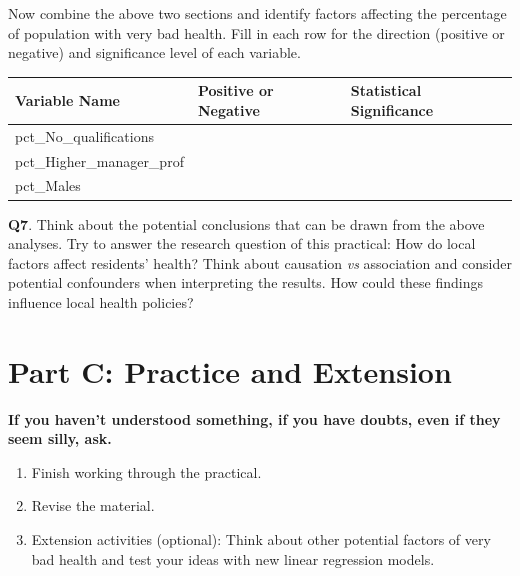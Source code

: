 \documentclass[
  letterpaper,
  DIV=11,
  numbers=noendperiod]{scrreprt}
\providecommand{\tightlist}{%
  \setlength{\itemsep}{0pt}\setlength{\parskip}{0pt}}\usepackage{longtable,booktabs,array}
\begin{document}
Now combine the above two sections and identify factors affecting the
percentage of population with very bad health. Fill in each row for the
direction (positive or negative) and significance level of each
variable.

\begin{longtable}[]{@{}
  >{\raggedright\arraybackslash}p{}
  >{\raggedright\arraybackslash}p{}
  >{\raggedright\arraybackslash}p{}@{}}
\toprule\noalign{}
\begin{minipage}[b]{\linewidth}\raggedright
Variable Name
\end{minipage} & \begin{minipage}[b]{\linewidth}\raggedright
Positive or Negative
\end{minipage} & \begin{minipage}[b]{\linewidth}\raggedright
Statistical Significance
\end{minipage} \\
\midrule\noalign{}
\endhead
\bottomrule\noalign{}
\endlastfoot
pct\_No\_qualifications & & \\
pct\_Higher\_manager\_prof & & \\
pct\_Males & & \\
\end{longtable}

\textbf{Q7}. Think about the potential conclusions that can be drawn
from the above analyses. Try to answer the research question of this
practical: How do local factors affect residents' health? Think about
causation \emph{vs} association and consider potential confounders when
interpreting the results. How could these findings influence local
health policies?

\section{Part C: Practice and
Extension}\label{part-c-practice-and-extension}

\textbf{If you haven't understood something, if you have doubts, even if
they seem silly, ask.}

\begin{enumerate}
\def\labelenumi{\arabic{enumi}.}
\tightlist
\item
  Finish working through the practical.
\item
  Revise the material.
\item
  Extension activities (optional): Think about other potential factors
  of very bad health and test your ideas with new linear regression
  models.
\end{enumerate}
\end{document}
